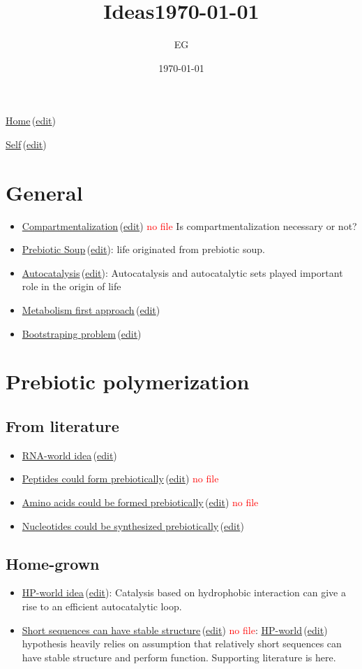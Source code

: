 \documentclass[12pt]{paper}
\title{Ideas\today}
\author{EG}
\date{\today}
\newcommand{\red}[1]{\textcolor{red}{#1}}
\newcommand{\wikilink}[2] { \href{#1.pdf}{#2}\,(\href{#1.tex}{edit})}
\begin{document}
 \maketitle
\wikilink{home}{Home}

\wikilink{ideas}{Self}
 
\tableofcontents


\section{General}
\begin{itemize}
 \item \wikilink{compartment}{Compartmentalization} \red{no file} Is compartmentalization 
necessary or not?
\item \wikilink{prebiotic\_soup}{Prebiotic Soup}: life originated from prebiotic soup.
\item \wikilink{autocatalysis}{Autocatalysis}: Autocatalysis and autocatalytic sets played 
important role in the origin of life
\item \wikilink{metabolism}{Metabolism first approach}
\item \wikilink{bootstraping_problem}{Bootstraping problem}
\end{itemize}


\section{Prebiotic polymerization}
\subsection{From literature}
\begin{itemize}
\item \wikilink{rna\_world}{RNA-world idea}
 \item  \wikilink{peptide\_world}{Peptides could form prebiotically} \red{no file}
 \item \wikilink{prebiotic\_aa}{Amino acids could be formed prebiotically} \red{no file}
 \item \wikilink{prebiotic\_nucleotides}{Nucleotides could be synthesized prebiotically}
\end{itemize}

\subsection{Home-grown}
\begin{itemize}
 \item \wikilink{hp\_world\_thesis}{HP-world idea}: Catalysis based on hydrophobic interaction can 
give a rise to an efficient 
autocatalytic loop.
\item \wikilink{short\_able\_sequences}{Short sequences can have stable structure} \red{no file}: 
\wikilink{hp\_world\_thesis}{HP-world}  hypothesis heavily relies on 
assumption that relatively short sequences can have stable structure and perform function. 
Supporting literature is here. 

\end{itemize}
\end{document}
